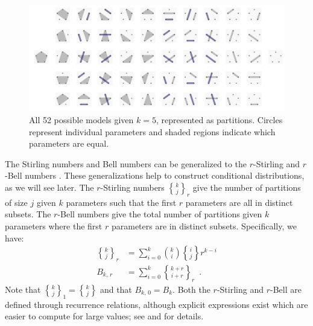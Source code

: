 \documentclass[11pt,a4paper]{article}
\theoremstyle{definition} %
\theoremstyle{case}
\DeclareRobustCommand{\stirling}{\genfrac\{\}{0pt}{}}
\newcommand{\rstirling}[3]{\stirling{#1}{#2}_{#3}}
\newcommand{\bellnum}[1]{B_{#1}}
\newcommand{\rbellnum}[2]{B_{#1,\,#2}}
\begin{document}
\begin{figure}
    \centering
    \includegraphics[width = \textwidth, keepaspectratio]{figures/modelspace_5_horizontal.pdf}
    \caption{All 52 possible models given $k = 5$, represented as partitions. Circles represent individual parameters and shaded regions indicate which parameters are equal.}
    \label{fig:partitions}
\end{figure}

The Stirling numbers and Bell numbers can be generalized to the $r$-Stirling \parencite{broder1984r} and $r$-Bell numbers \parencite{mezo2011r}. These generalizations help to construct conditional distributions, as we will see later. The $r$-Stirling numbers $\rstirling{k}{j}{r}$ give the number of partitions of size $j$ given $k$ parameters such that the first $r$ parameters are all in distinct subsets. The $r$-Bell numbers give the total number of partitions given $k$ parameters where the first $r$ parameters are in distinct subsets. Specifically, we have:
\begin{align}
    \rstirling{k}{j}{r} &= \sum_{i=0}^k \binom{k}{i}\stirling{i}{j}r^{k-i}\\
    \rbellnum{k}{r} &= \sum_{i=0}^k \rstirling{k+r}{i+r}{r} \enspace .
\end{align}
Note that $\rstirling{k}{j}{1} = \stirling{k}{j}$ and that $\rbellnum{k}{0} = \bellnum{k}$. Both the $r$-Stirling and $r$-Bell are defined through recurrence relations, although explicit expressions exist which are easier to compute for large values; see \textcite{broder1984r} and \textcite{mezo2011r} for details.
\end{document}
